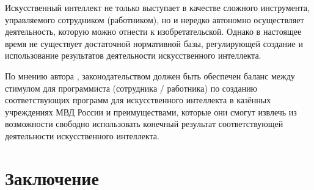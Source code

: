 Искусственный интеллект не только выступает в
качестве сложного инструмента, управляемого сотрудником (работником), но и нередко автономно
осуществляет деятельность, которую можно отнести к изобретательской. Однако в настоящее время
не существует достаточной нормативной базы, регулирующей создание и использование
результатов деятельности искусственного интеллекта.

По мнению автора \cite{civil},
законодательством должен быть обеспечен баланс между стимулом для программиста (сотрудника / работника)
по созданию соответствующих программ для искусственного интеллекта в казённых учреждениях МВД России
и преимуществами, которые они смогут извлечь из возможности свободно
использовать конечный результат соответствующей деятельности искусственного интеллекта.
\newpage

\section{Заключение}
\newpage

